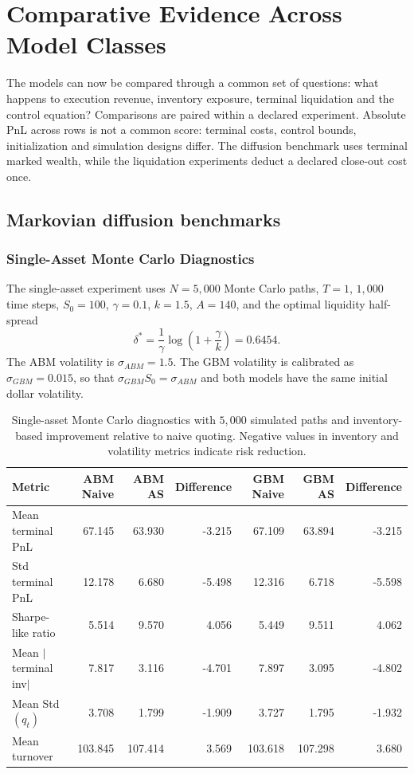 \chapter{Comparative Evidence Across Model Classes}\label{ch:results}
The models can now be compared through a common set of questions: what happens to execution revenue, inventory exposure, terminal liquidation and the control equation? Comparisons are paired within a declared experiment. Absolute PnL across rows is not a common score: terminal costs, control bounds, initialization and simulation designs differ. The diffusion benchmark uses terminal marked wealth, while the liquidation experiments deduct a declared close-out cost once.

\section{Markovian diffusion benchmarks}



\subsection{Single-Asset Monte Carlo Diagnostics}

The single-asset experiment uses $N=5{,}000$ Monte Carlo paths, $T=1$, $1{,}000$ time steps, $S_0=100$, $\gamma=0.1$, $k=1.5$, $A=140$, and the optimal liquidity half-spread
\[
\delta^*=
\frac{1}{\gamma}\log\!\left(1+\frac{\gamma}{k}\right)
=
0.6454.
\]
The ABM volatility is $\sigma_{ABM}=1.5$. The GBM volatility is calibrated as $\sigma_{GBM}=0.015$, so that $\sigma_{GBM}S_0=\sigma_{ABM}$ and both models have the same initial dollar volatility.

\begin{table}[H]
\centering
\small
\caption{Single-asset Monte Carlo diagnostics with $5{,}000$ simulated paths and inventory-based improvement relative to naive quoting. Negative values in inventory and volatility metrics indicate risk reduction.}
\begin{tabular*}{\textwidth}{@{\extracolsep{\fill}}l!{\vrule width 0.5pt}rrr!{\vrule width 0.5pt}rrr@{}}
\toprule
Metric & ABM Naive & ABM AS & Difference & GBM Naive & GBM AS & Difference \\
\midrule
Mean terminal PnL        & 67.145 & 63.930 & -3.215 & 67.109 & 63.894 & -3.215 \\
Std terminal PnL         & 12.178 &  6.680 & -5.498 & 12.316 &  6.718 & -5.598 \\
Sharpe-like ratio        &  5.514 &  9.570 &  4.056 &  5.449 &  9.511 &  4.062 \\
Mean $|$terminal inv$|$  &  7.817 &  3.116 & -4.701 &  7.897 &  3.095 & -4.802 \\
Mean Std$(q_t)$          &  3.708 &  1.799 & -1.909 &  3.727 &  1.795 & -1.932 \\
Mean turnover            &103.845 &107.414 &  3.569 &103.618 &107.298 &  3.680 \\
\bottomrule
\end{tabular*}
\end{table}

